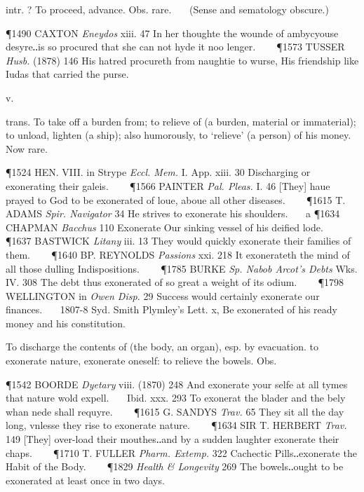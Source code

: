 \begin{description}[wide, labelwidth=!, labelindent=0pt]
\begin{myenumerate}
 intr. ? To proceed, advance. Obs. rare.
   (Sense and sematology obscure.)

\P 1490 CAXTON  \textit{Eneydos} xiii. 47 In her thoughte the wounde of ambycyouse desyre‥is so procured that she can not hyde it noo lenger.    
\P 1573 TUSSER  \textit{Husb.} (1878) 146 His hatred procureth from naughtie to wurse, His friendship like Iudas that carried the purse.
\end{myenumerate}


 v.

\noindent {}

\vspace{-0.3cm}

\begin{myenumerate}

 trans. To take off a burden from; to relieve of (a burden, material or immaterial); to unload, lighten (a ship); also humorously, to ‘relieve’ (a person) of his money. Now rare.

\P 1524 HEN. VIII. in  Strype \textit{Eccl. Mem.} I. App. xiii. 30 Discharging or exonerating their galeis.    
\P 1566 PAINTER  \textit{Pal. Pleas.} I. 46 [They] haue prayed to God to be exonerated of loue, aboue all other diseases.    
\P 1615 T. ADAMS  \textit{Spir. Navigator} 34 He strives to exonerate his shoulders.    a 
\P 1634 CHAPMAN  \textit{Bacchus} 110 Exonerate Our sinking vessel of his deified lode.    
\P 1637 BASTWICK  \textit{Litany} iii. 13 They would quickly exonerate their families of them.    
\P 1640 BP. REYNOLDS  \textit{Passions} xxi. 218 It exonerateth the mind of all those dulling Indispositions.    
\P 1785 BURKE  \textit{Sp. Nabob Arcot's Debts} Wks. IV. 308 The debt thus exonerated of so great a weight of its odium.    
\P 1798 WELLINGTON in  \textit{Owen Disp.} 29 Success would certainly exonerate our finances.    1807-8 Syd. Smith Plymley's Lett. x, Be exonerated of his ready money and his constitution.

 To discharge the contents of (the body, an organ), esp. by evacuation. to exonerate nature, exonerate oneself: to relieve the bowels. Obs.

\P 1542 BOORDE  \textit{Dyetary} viii. (1870) 248 And exonerate your selfe at all tymes that nature wold expell.    Ibid. xxx. 293 To exonerat the blader and the bely whan nede shall requyre.    
\P 1615 G. SANDYS  \textit{Trav.} 65 They sit all the day long, vnlesse they rise to exonerate nature.    
\P 1634 SIR T. HERBERT  \textit{Trav.} 149 [They] over-load their mouthes‥and by a sudden laughter exonerate their chaps.    
\P 1710 T. FULLER  \textit{Pharm. Extemp.} 322 Cachectic Pills‥exonerate the Habit of the Body.    
\P 1829 \textit{Health \& Longevity } 269 The bowels‥ought to be exonerated at least once in two days.


\end{myenumerate}
\end{description}
